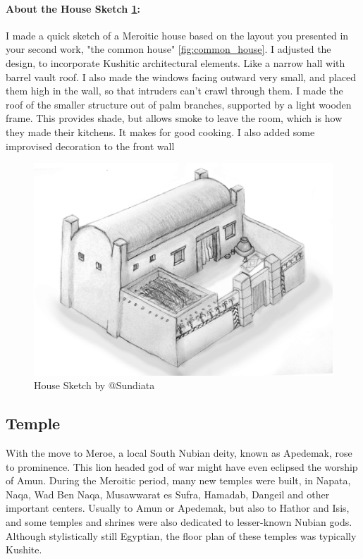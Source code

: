 \documentclass[a4paper,12pt]{scrreprt}
\begin{document}
\paragraph{About the House Sketch \ref{fig:house_sketch}:} I made a quick sketch of a Meroitic house based on the layout you presented in your second work, "the common house" \ref{fig:common_house}. I adjusted the design, to incorporate Kushitic architectural elements. Like a narrow hall with barrel vault roof. I also made the windows facing outward very small, and placed them high in the wall, so that intruders can't crawl through them. I made the roof of the smaller structure out of palm branches, supported by a light wooden frame. This provides shade, but allows smoke to leave the room, which is how they made their kitchens. It makes for good cooking. I also added some improvised decoration to the front wall 

\begin{figure}[H]
	\centering
	\includegraphics[width=\textwidth]{img/house/sundiata_house_sketch}
	\caption{House Sketch by @Sundiata}\label{fig:house_sketch}
\end{figure}

\subsection{Temple}

With the move to Meroe, a local South Nubian deity, known as Apedemak, rose to prominence. This lion headed god of war might have even eclipsed the worship of Amun. During the Meroitic period, many new temples were built, in Napata, Naqa, Wad Ben Naqa, Musawwarat es Sufra, Hamadab, Dangeil and other important centers. Usually to Amun or Apedemak, but also to Hathor and Isis, and some temples and shrines were also dedicated to lesser-known Nubian gods. Although stylistically still Egyptian, the floor plan of these temples was typically Kushite. 
\end{document}
